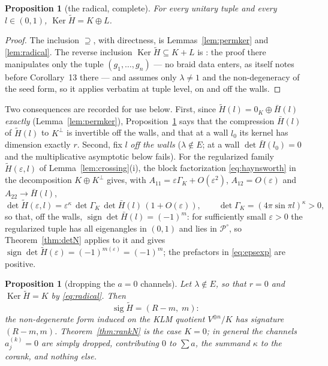 \documentclass[11pt]{article}
\newtheorem{proposition}[theorem]{Proposition}
\theoremstyle{definition}
\newcommand{\Ht}{\widetilde H}
\newcommand{\Ker}{\operatorname{Ker}}
\begin{document}
\begin{proposition}[the radical, complete]\label{prop:radical}
For every unitary tuple and every $l\in(0,1)$,
$\Ker\Ht=K\oplus L$.
\end{proposition}

\begin{proof}
The inclusion $\supseteq$, with directness, is
Lemmas~\ref{lem:permker} and \ref{lem:radical}. The reverse
inclusion $\Ker\Ht\subseteq K+L$ is \cite[Thm.~9, Step~2]{N-KLM}:
the proof there manipulates only the tuple $(g_1,\dots,g_n)$ --- no
braid data enters, as \cite{N-KLM} itself notes before
Corollary~13 there --- and assumes only $\lambda\neq1$ and the
non-degeneracy of the seed form, so it applies verbatim at tuple
level, on and off the walls.
\end{proof}

Two consequences are recorded for use below. First, since
$\Ht(l)=0_{K}\oplus\bar H(l)$ \emph{exactly}
(Lemma~\ref{lem:permker}), Proposition~\ref{prop:radical} says that
the compression $\bar H(l)$ of $\Ht(l)$ to $K^{\perp}$ is
invertible off the walls, and that at a wall $l_0$ its kernel has
dimension exactly $r$. Second, fix $l$ \emph{off the walls} ($\lambda\notin E$; at a wall
$\det\bar H(l_0)=0$ and the multiplicative asymptotic below fails).
For the regularized family
$\Ht(\varepsilon,l)$ of Lemma~\ref{lem:crossing}(i), the block
factorization \eqref{eq:haynsworth} in the decomposition
$K\oplus K^{\perp}$ gives, with
$A_{11}=\varepsilon\Gamma_K+O(\varepsilon^{2})$,
$A_{12}=O(\varepsilon)$ and $A_{22}\to\bar H(l)$,
\begin{equation}\label{eq:epsexp}
\det\Ht(\varepsilon,l)
=\varepsilon^{\kappa}\,\det\Gamma_K\,\det\bar H(l)\,
(1+O(\varepsilon)),
\qquad \det\Gamma_K=(4\pi\sin\pi l)^{\kappa}>0 ,
\end{equation}
so that, off the walls,
$\operatorname{sign}\det\bar H(l)=(-1)^{m}$: for sufficiently small
$\varepsilon>0$ the regularized tuple has all eigenangles in $(0,1)$
and lies in $\mathcal P^{\circ}$, so Theorem~\ref{thm:detN} applies to
it and gives
$\operatorname{sign}\det\Ht(\varepsilon)=(-1)^{m(\varepsilon)}
=(-1)^{m}$; the prefactors in \eqref{eq:epsexp} are positive.

\begin{proposition}[dropping the $a=0$ channels]\label{prop:dropK}
Let $\lambda\notin E$, so that $r=0$ and $\Ker\Ht=K$ by
\eqref{eq:radical}. Then
\[
\operatorname{sig}\Ht=(R-m,\;m):
\]
the non-degenerate form induced on the KLM quotient $V^{\oplus n}/K$
has signature $(R-m,m)$. Theorem~\ref{thm:rankN} is the case $K=0$; in
general the channels $a_j^{(k)}=0$ are simply dropped, contributing
$0$ to $\sum a$, the summand $\kappa$ to the corank, and nothing else.
\end{proposition}
\end{document}
